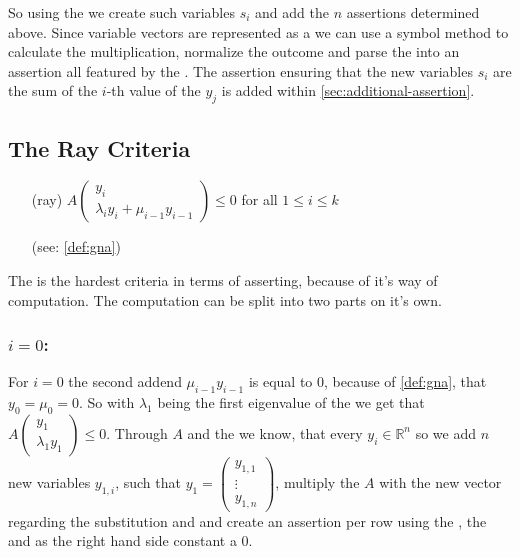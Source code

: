 So using the \smtfactory we create such variables $s_i$ and add the $n$ assertions determined above.\newline
Since variable vectors are represented as a \rpntree we can use a symbol method to calculate the multiplication, normalize the outcome and parse the \rpntree into an assertion all featured by the \smtfactory. \newline
The assertion ensuring that the new variables $s_i$ are the sum of the $i$-th value of the $y_j$ is added within \autoref{sec:additional-assertion}.


\subsection{The Ray Criteria}
\label{sec:ray-criteria}
\begin{itemize}
	\setlength{\itemindent}{1in}
	\item[(ray)] $A\begin{pmatrix} y_i \\ \lambda_i y_i + \mu_{i-1} y_{i-1} \end{pmatrix} \le 0$ for all $1 \le i \le k$
	\item[] (see: \autoref{def:gna})
\end{itemize}
The \rayc is the hardest criteria in terms of asserting, because of it's way of computation. \newline
The computation can be split into two parts on it's own.
\subsubsection{$i=0$:}
For $i=0$ the second addend $\mu_{i-1}y_{i-1}$ is equal to $0$, because of \autoref{def:gna}, that $y_0 = \mu_0 = 0$. So with $\lambda_1$ being the first eigenvalue of the \updatematrix we get that $A\begin{pmatrix} y_1 \\ \lambda_1 y_1 \end{pmatrix} \le 0$. \newline
Through $A$ and the \domc we know, that every $y_i\in \mathbb{R}^n$ so we add $n$ new variables $y_{1,i}$, such that $y_1 = \begin{pmatrix} y_{1,1} \\ \vdots \\ y_{1,n}\end{pmatrix}$, multiply the \updatematrix $A$ with the new vector regarding the substitution and and create an assertion per row using the \smtfactory, the   and as the right hand side constant a 0.

